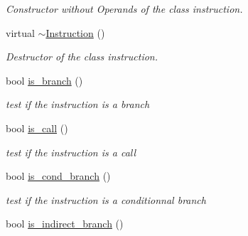\begin{DoxyCompactItemize}
\begin{DoxyCompactList}\small\item\em Constructor without Operands of the class instruction. \end{DoxyCompactList}\item 
\hypertarget{class_instruction_a3f1031e811b710787678f8faf8cc9672}{}virtual \hyperlink{class_instruction_a3f1031e811b710787678f8faf8cc9672}{$\sim$\+Instruction} ()\label{class_instruction_a3f1031e811b710787678f8faf8cc9672}

\begin{DoxyCompactList}\small\item\em Destructor of the class instruction. \end{DoxyCompactList}\item 
\hypertarget{class_instruction_aab8e6a16b8bab5ca90b554086cc3c825}{}bool \hyperlink{class_instruction_aab8e6a16b8bab5ca90b554086cc3c825}{is\+\_\+branch} ()\label{class_instruction_aab8e6a16b8bab5ca90b554086cc3c825}

\begin{DoxyCompactList}\small\item\em test if the instruction is a branch \end{DoxyCompactList}\item 
\hypertarget{class_instruction_ab2a6352a09271a588f6930852a361f67}{}bool \hyperlink{class_instruction_ab2a6352a09271a588f6930852a361f67}{is\+\_\+call} ()\label{class_instruction_ab2a6352a09271a588f6930852a361f67}

\begin{DoxyCompactList}\small\item\em test if the instruction is a call \end{DoxyCompactList}\item 
\hypertarget{class_instruction_a1b607074554bc160142786c125bde530}{}bool \hyperlink{class_instruction_a1b607074554bc160142786c125bde530}{is\+\_\+cond\+\_\+branch} ()\label{class_instruction_a1b607074554bc160142786c125bde530}

\begin{DoxyCompactList}\small\item\em test if the instruction is a conditionnal branch \end{DoxyCompactList}\item 
\hypertarget{class_instruction_affdf2382cd36277fb4427cd3b07c1402}{}bool \hyperlink{class_instruction_affdf2382cd36277fb4427cd3b07c1402}{is\+\_\+indirect\+\_\+branch} ()\label{class_instruction_affdf2382cd36277fb4427cd3b07c1402}


\end{DoxyCompactItemize}

